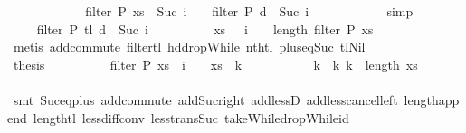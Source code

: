 \begin{isabellebody}
\ \ \ \ \isamarkupfalse%
{\isacharminus}\isanewline
\ \ \ \ \ \ \isamarkupfalse%
\ {\isachardoublequoteopen}filter\ P\ xs\ {\isacharbang}\ {\isacharparenleft}Suc\ i\ {\isacharplus}\ {}{\isacharparenright}\ {\isacharequal}\ filter\ P\ {\isacharquery}d\ {\isacharbang}\ {\isacharparenleft}Suc\ i\ {\isacharplus}\ {}{\isacharparenright}{\isachardoublequoteclose}\isanewline
\ \ \ \ \ \ \ \ \isamarkupfalse%
\ simp\isanewline
\ \ \ \ \ \ \isamarkupfalse%
\ \isamarkupfalse%
\ {\isachardoublequoteopen}{\isachardot}{\isachardot}{\isachardot}\ {\isacharequal}\ filter\ P\ {\isacharparenleft}tl\ {\isacharquery}d{\isacharparenright}\ {\isacharbang}\ {\isacharparenleft}Suc\ i{\isacharparenright}{\isachardoublequoteclose}\isanewline
\ \ \ \ \ \ \ \ \isamarkupfalse%
\ {\isacharbackquoteopen}{\isacharquery}xs\ {\isasymnoteq}\ {\isacharbrackleft}{\isacharbrackright}{\isacharbackquoteclose}\ {\isacartoucheopen}i\ {\isacharplus}\ {}\ {\isacharless}\ length\ {\isacharparenleft}filter\ P\ {\isacharquery}xs{\isacharparenright}{\isacartoucheclose}\isanewline
\ \ \ \ \ \ \ \ \isamarkupfalse%
\ {\isacharparenleft}metis\ add{\isachardot}commute\ filter{\isacharunderscore}tl\ hd{\isacharunderscore}dropWhile\ nth{\isacharunderscore}tl\ plus{\isacharunderscore}{}{\isacharunderscore}eq{\isacharunderscore}Suc\ tl{\isacharunderscore}Nil{\isacharparenright}\isanewline
\ \ \ \ \ \ \isamarkupfalse%
\isanewline
\ \ \ \ \ \ \isamarkupfalse%
\ {\isacharquery}thesis\isanewline
\ \ \ \ \ \ \ \ \isamarkupfalse%
\ {\isacharbackquoteopen}filter\ P\ {\isacharquery}xs\ {\isacharbang}\ {\isacharparenleft}i\ {\isacharplus}\ {}{\isacharparenright}\ {\isacharequal}\ {\isacharquery}xs\ {\isacharbang}\ k{}{\isacharbackquoteclose}\ {\isacharasterisk}\isanewline
\ \ \ \ \ \ \ \ \isamarkupfalse%
\ {\isacartoucheopen}k{}\ {\isacharless}\ k{}{\isacartoucheclose}\ {\isacartoucheopen}k{}\ {\isacharless}\ length\ {\isacharquery}xs{\isacartoucheclose}\ \isanewline
\ \ \ \ \ \ \ \ \isamarkupfalse%
\ {\isacharparenleft}smt\ Suc{\isacharunderscore}eq{\isacharunderscore}plus{}\ add{\isachardot}commute\ add{\isacharunderscore}Suc{\isacharunderscore}right\ add{\isacharunderscore}lessD{}\ add{\isacharunderscore}less{\isacharunderscore}cancel{\isacharunderscore}left\ length{\isacharunderscore}append\ length{\isacharunderscore}tl\ less{\isacharunderscore}diff{\isacharunderscore}conv\ less{\isacharunderscore}trans{\isacharunderscore}Suc\ takeWhile{\isacharunderscore}dropWhile{\isacharunderscore}id{\isacharparenright}\isanewline

\end{isabellebody}
